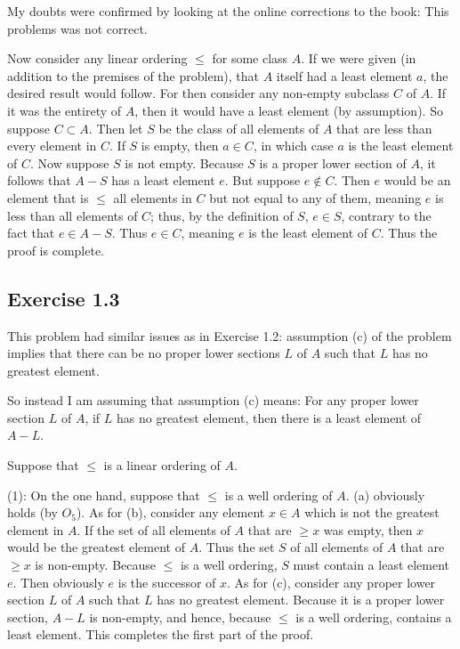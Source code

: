 \documentclass{article}
\theoremstyle{definition}
\begin{document}
My doubts were confirmed by looking at the online corrections to the book: This problems was not correct.

Now consider any linear ordering $\le$ for some class $A$. If we were given (in addition to the premises of the problem), that $A$ itself had a least element $a$, the desired 
result would follow. For then consider any non-empty subclass $C$ of $A$. If it was the entirety of $A$, then it would have a least element (by assumption). So suppose 
$C\subset A$. Then let $S$ be the class of all elements of $A$ that are less than every element in $C$. If $S$ is empty, then $a\in C$, in which case 
$a$ is the least element of $C$. Now suppose $S$ is not empty. Because $S$ is a proper lower section of 
$A$, it follows that $A-S$ has a least element $e$. But suppose $e\notin C$. Then $e$ would be an element that is $\le$ all elements in $C$ but not equal to any of them, meaning 
$e$ is less than all elements of $C$; thus, by the definition of 
$S$, $e\in S$, contrary to the fact that $e\in A-S$. Thus $e\in C$, meaning $e$ is the least element of $C$. Thus the proof is complete.

\subsection*{Exercise 1.3}
This problem had similar issues as in Exercise 1.2: assumption (c) of the problem implies that there can be no proper lower sections $L$ of $A$ such that 
$L$ has no greatest element.

So instead I am assuming that assumption (c) means: For any proper lower section $L$ of $A$, if $L$ has no greatest element, then there is a least 
element of $A-L$.

Suppose that $\le$ is a linear ordering of $A$.

(1): On the one hand, suppose that $\le$ is a well ordering of $A$. (a) obviously holds (by $O_5$). As for (b), consider any element $x\in A$ which is not the greatest element 
in $A$. If the set of all elements of $A$ that are $\ge x$ was empty, then $x$ would be the greatest element of $A$. Thus the set $S$ of all elements of $A$ that are $\ge x$ is non-empty. Because 
$\le$ is a well ordering, $S$ must contain a least element $e$. Then obviously $e$ is the successor of $x$. As for (c), consider any proper lower section $L$ of $A$ such that 
$L$ has no greatest element. Because it is a proper lower section, $A-L$ is non-empty, and hence, because $\le$ is a well ordering, contains a least element. This completes the first part of the 
proof.
\end{document}
